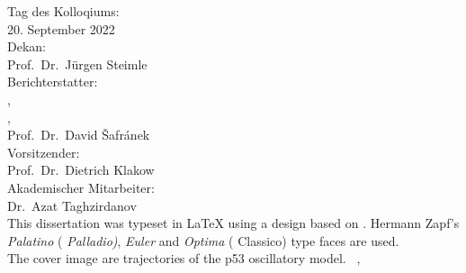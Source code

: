 \thispagestyle{empty}

\hfill
\vfill

{\raggedright
\noindent
Tag des Kolloqiums: \\
\hspace*{20pt}20. September 2022 \\
Dekan:\\
\hspace*{20pt}Prof.\ Dr.\ Jürgen Steimle\\
Berichterstatter:\\
\hspace*{20pt}\myProf,\\
\hspace*{20pt}\myOtherProf,\\
\hspace*{20pt}Prof.\ Dr.\ David Šafránek \\
Vorsitzender: \\
\hspace*{20pt}Prof.\ Dr.\ Dietrich Klakow\\
Akademischer Mitarbeiter:\\
\hspace{20pt}Dr.\ Azat Taghzirdanov\\
\bigskip
\noindent
This dissertation was typeset in \LaTeX{}  using a design based on \texttt{\classicthesis}.
Hermann Zapf's \emph{Palatino} (\emph{ Palladio)}, \emph{Euler} and \emph{Optima} ( Classico) type faces are used.\\
The cover image are trajectories of the p53 oscillatory model.
\bigskip
\noindent
\textcopyright\ \myName, \myTime
}
